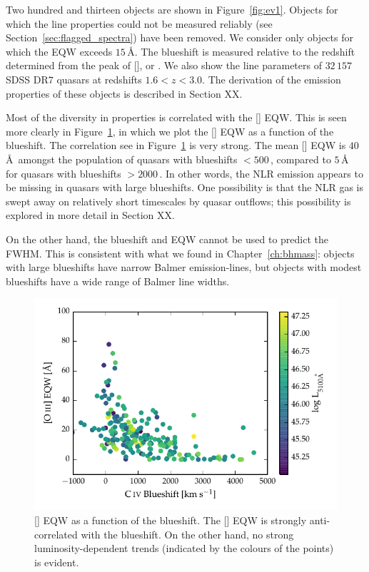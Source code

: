 Two hundred and thirteen objects are shown in Figure~\ref{fig:ev1}.
Objects for which the  line properties could not be measured reliably (see Section~\ref{sec:flagged_spectra}) have been removed. 
We consider only objects for which the  EQW exceeds $15$\,\AA. 
The  blueshift is measured relative to the redshift determined from the peak of [], \hb or \hans. 
We also show the  line parameters of $32\,157$ SDSS DR$7$ quasars at redshifts $1.6 < z < 3.0$. 
The derivation of the  emission properties of these objects is described in Section XX. 

Most of the diversity in  properties is correlated with the [] EQW. 
This is seen more clearly in Figure~\ref{fig:civ_blueshift_oiii_eqw}, in which we plot the [] EQW as a function of the  blueshift. 
The correlation see in Figure~\ref{fig:civ_blueshift_oiii_eqw} is very strong. 
The mean [] EQW is $40$\,\AA\, amongst the population of quasars with  blueshifts $<500$\,\kms, compared to $5$\,\AA\, for quasars with  blueshifts $>2000$\,\kms. 
In other words, the NLR emission appears to be missing in quasars with large  blueshifts. 
One possibility is that the NLR gas is swept away on relatively short timescales by quasar outflows; this possibility is explored in more detail in Section XX. 

On the other hand, the  blueshift and EQW cannot be used to predict the \hb FWHM. 
This is consistent with what we found in Chapter~\ref{ch:bhmass}: objects with large  blueshifts have narrow Balmer emission-lines, but objects with modest  blueshifts have a wide range of Balmer line widths. 

\begin{figure}
    \centering
    \includegraphics[width=\columnwidth]{figures/chapter04/civ_blueshift_oiii_eqw.pdf} 
    \caption[{[] EQW as a function of the  blueshift.}]{[] EQW as a function of the  blueshift. The [] EQW is strongly anti-correlated with the  blueshift. On the other hand, no strong luminosity-dependent trends (indicated by the colours of the points) is evident.}     
    \label{fig:civ_blueshift_oiii_eqw}
\end{figure}

